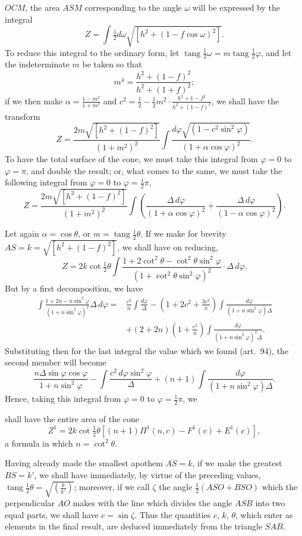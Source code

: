 \documentclass{article}
\begin{document}
$OCM$, the area $ASM$ corresponding to the angle $\omega$ will be expressed by the integral
\[ Z=\int\tfrac{1}{2}d\omega\sqrt{[h^{2}+(1-f\cos\omega)^{2}]}. \]
To reduce this integral to the ordinary form, let $\operatorname{tang}\frac{1}{2}\omega=m\operatorname{tang}\frac{1}{2}\varphi$, and let the indeterminate $m$ be taken so that
\[ m^{4}=\frac{h^{2}+(1-f)^{2}}{h^{2}+(1+f)^{2}}; \]
if we then make $\alpha=\frac{1-m^{2}}{1+m^{2}}$ and $c^{2}=\frac{1}{2}-\frac{1}{2}m^{2}\cdot\frac{h^{2}+1-f^{2}}{h^{2}+(1-f)^{2}}$, we shall have the transform
\[ Z=\frac{2m\sqrt{[h^{2}+(1-f)^{2}]}}{(1+m^{2})^{2}}\int\frac{d\varphi\sqrt{(1-c^{2}\sin^{2}\varphi)}}{(1+\alpha\cos\varphi)^{2}}. \]
To have the total surface of the cone, we must take this integral from $\varphi=0$ to $\varphi=\pi$, and double the result; or, what comes to the same, we must take the following integral from $\varphi=0$ to $\varphi=\frac{1}{2}\pi$,
\[ Z=\frac{2m\sqrt{[h^{2}+(1-f)^{2}]}}{(1+m^{2})^{2}}\int\left(\frac{\Delta\,d\varphi}{(1+\alpha\cos\varphi)^{2}}+\frac{\Delta\,d\varphi}{(1-\alpha\cos\varphi)^{2}}\right). \]

Let again $\alpha=\cos\theta$, or $m=\operatorname{tang}\frac{1}{2}\theta$. If we make for brevity $AS=k=\sqrt{[h^{2}+(1-f)^{2}]}$, we shall have on reducing,
\[ Z=2k\cot\tfrac{1}{2}\theta\int\frac{1+2\cot^{2}\theta-\cot^{2}\theta\sin^{2}\varphi}{(1+\cot^{2}\theta\sin^{2}\varphi)^{2}}\cdot\Delta\,d\varphi. \]
But by a first decomposition, we have
\[ \begin{aligned} \int\frac{1+2n-n\sin^{2}\varphi}{(1+n\sin^{2}\varphi)^{2}}\Delta\,d\varphi={}&\frac{c^{2}}{n}\int\frac{d\varphi}{\Delta}-\left(1+2c^{2}+\frac{3c^{2}}{n}\right)\int\frac{d\varphi}{(1+n\sin^{2}\varphi)\Delta}\\ &+(2+2n)\left(1+\frac{c^{2}}{n}\right)\int\frac{d\varphi}{(1+n\sin^{2}\varphi)^{2}\Delta}. \end{aligned} \]
Substituting then for the last integral the value which we found (art.\ 94), the second member will become
\[ \frac{n\Delta\sin\varphi\cos\varphi}{1+n\sin^{2}\varphi}-\int\frac{c^{2}\,d\varphi\sin^{2}\varphi}{\Delta}+(n+1)\int\frac{d\varphi}{(1+n\sin^{2}\varphi)\Delta}. \]
Hence, taking this integral from $\varphi=0$ to $\varphi=\frac{1}{2}\pi$, we

shall have the entire area of the cone
\[ Z^{1}=2k\cot\tfrac{1}{2}\theta[(n+1)\Pi^{1}(n,c)-F^{1}(c)+E^{1}(c)], \]
a formula in which $n=\cot^{2}\theta$.

Having already made the smallest apothem $AS=k$, if we make the greatest $BS=k'$, we shall have immediately, by virtue of the preceding values, $\operatorname{tang}\frac{1}{2}\theta=\sqrt{\left(\frac{k}{k'}\right)}$; moreover, if we call $\zeta$ the angle $\frac{1}{2}(ASO+BSO)$ which the perpendicular $AO$ makes with the line which divides the angle $ASB$ into two equal parts, we shall have $c=\sin\zeta$. Thus the quantities $c$, $k$, $\theta$, which enter as elements in the final result, are deduced immediately from the triangle $SAB$.
\end{document}
